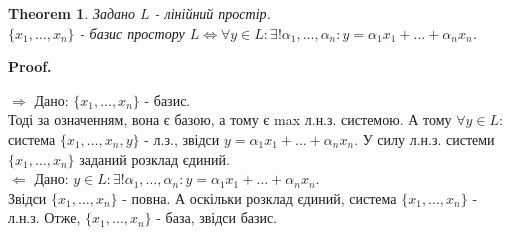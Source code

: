 \documentclass[a4paper, 10pt]{article}
\makeatletter
\def\rightproof{$\boxed{\Rightarrow}$ }
\def\leftproof{$\boxed{\Leftarrow}$ }
\theoremstyle{theoremdd}
\newtheorem{theorem}{Theorem}[subsection]
\renewenvironment{proof}[1][Proof.\\]{\par
\pushQED{\hfill \qed}%
\normalfont \topsep6\p@\@plus6\p@\relax
\trivlist
\item\relax
{\bfseries
#1\@addpunct{.}}\hspace\labelsep\ignorespaces
}{%
\popQED\endtrivlist\@endpefalse
}
\makeatother
\begin{document}
	\iffalse
	\begin{theorem}
	Задано $L$ - лінійний простір та систему $\{x_1, \dots, x_n\} \subset L$. Наступні властивості еквівалентні:\\
	$1) \{x_1, \dots, x_n\}$ - max л.н.з.\\
	$2) \{x_1, \dots, x_n\}$ - повна л.н.з.\\
	$3) \forall y \in L: \exists! \alpha_1, \dots, \alpha_n: y = \alpha_1 x_1 + \dots + \alpha_n x_n$.\\
	\textit{Один з трьох варіантів дозволяє довести існування базису.}
	\end{theorem}
	
	\begin{proof}
	$\boxed{1) \Leftrightarrow 2)}$ вже було.
	\bigskip \\
	$\boxed{2) \Rightarrow 3)}$ Дано: $\{x_1, \dots, x_n\}$ - повна л.н.з.\\
	$\forall y \in L: \exists \alpha_1, \dots, \alpha_n: y = \alpha_1 x_1 + \dots + \alpha_n x_n$.\\
	Із властивості систем л.н.з. елементів, отримаємо, що розклад є єдиним.
	\bigskip \\
	$\boxed{2) \Leftarrow 3)}$ Дано: $\forall y \in L: \exists! \alpha_1, \dots, \alpha_n: y = \alpha_1 x_1 + \dots + \alpha_n x_n$\\
	Тоді $\{x_1, \dots, x_n\}$ - повна і, за властивістю, л.н.з.
	\end{proof}
	\fi
	
	\begin{theorem}
	\label{basis_iff_uniquely_decomposed_as_combination}
	Задано $L$ - лінійний простір.\\
	$\{x_1,\dots,x_n\}$ - базис простору $L \iff \forall y \in L: \exists! \alpha_1, \dots, \alpha_n: y = \alpha_1 x_1 + \dots + \alpha_n x_n$. 
	\end{theorem}
	
	\begin{proof}
	\rightproof Дано: $\{x_1,\dots,x_n\}$ - базис.\\
	Тоді за означенням, вона є базою, а тому є max л.н.з. системою. А тому $\forall y \in L:$ система $\{x_1,\dots,x_n,y\}$ - л.з., звідси $y = \alpha_1x_1+\dots+\alpha_n x_n$. У силу л.н.з. системи $\{x_1,\dots,x_n\}$ заданий розклад єдиний.
	\bigskip \\
	\leftproof Дано: $y \in L: \exists! \alpha_1, \dots, \alpha_n: y = \alpha_1 x_1 + \dots + \alpha_n x_n$.\\
	Звідси $\{x_1,\dots,x_n\}$ - повна. А оскільки розклад єдиний, система $\{x_1,\dots,x_n\}$ - л.н.з. Отже, $\{x_1,\dots,x_n\}$ - база, звідси базис.
	\end{proof}
	
\end{document}
